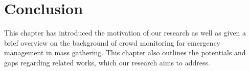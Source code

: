 \section{Conclusion}
This chapter has introduced the motivation of our research as well as given a brief overview on the background of crowd monitoring for emergency management in mass gathering. This chapter also outlines the potentials and gaps regarding related works, which our research aims to address.